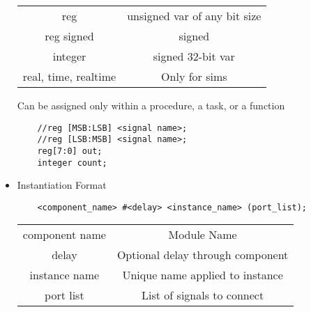 \documentclass{article}
\begin{document}
\begin{itemize}
\begin{center}
\begin{tabular}{ |c|c| } 
 \hline
 reg & unsigned var of any bit size  \\ 
 reg signed & signed  \\ 
 integer & signed 32-bit var  \\ 
 real, time, realtime & Only for sims \\
 \hline
\end{tabular}
\end{center}
Can be assigned only within a procedure, a task, or a function
\begin{lstlisting}
    //reg [MSB:LSB] <signal name>;
    //reg [LSB:MSB] <signal name>;
    reg[7:0] out;
    integer count;
\end{lstlisting}

\item Instantiation Format
\begin{lstlisting}
    <component_name> #<delay> <instance_name> (port_list);
\end{lstlisting}
\begin{center}
\begin{tabular}{ |c|c| } 
 \hline
 component name & Module Name\\
 delay & Optional delay through component\\
 instance name & Unique name applied to instance\\
 port list & List of signals to connect\\
 \hline
\end{tabular}
\end{center}



\end{itemize}
\end{document}
